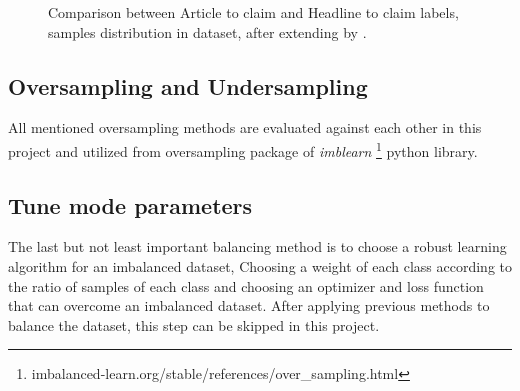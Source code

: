 \begin{figure}%
	\centering
	\qquad
	\caption{Comparison between Article to claim and Headline to claim labels, samples distribution in \cite{stance_persian} dataset, after extending by \cite{parsfever} .}%
	\label{fig:datab1}%
\end{figure}

\subsection{Oversampling and Undersampling}
 
All mentioned oversampling methods are evaluated against each other in this project and utilized from oversampling package of \textit{imblearn} \footnote{imbalanced-learn.org/stable/references/over\_sampling.html} python library. 

\subsection{Tune mode parameters}
 The last but not least important balancing method is to choose a robust learning algorithm for an imbalanced dataset, Choosing a weight of each class according to the ratio of samples of each class and choosing an optimizer and loss function that can overcome an imbalanced dataset. After applying previous methods to balance the dataset, this step can be skipped in this project. 




